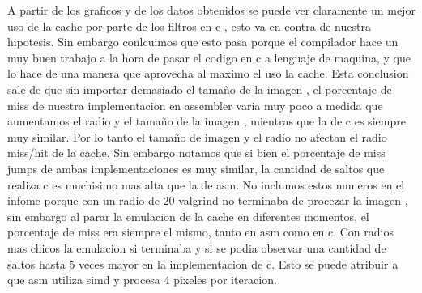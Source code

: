 A partir de los graficos y de los datos obtenidos se puede ver claramente un mejor uso de la cache por parte de los filtros en c , esto va en contra de nuestra hipotesis. Sin embargo conlcuimos que esto pasa porque el compilador hace un muy buen trabajo a la hora de pasar el codigo en c a lenguaje de maquina, y que lo hace de una manera que aprovecha al maximo el uso la cache. Esta conclusion sale de que sin importar demasiado el tamaño de la imagen , el porcentaje de miss de nuestra implementacion en assembler varia muy poco a medida que aumentamos el radio y el tamaño de la imagen , mientras que la de c es siempre muy similar. Por lo tanto el tamaño de imagen y el radio no afectan el radio miss/hit de la cache. Sin embargo notamos que si bien el porcentaje de miss jumps de ambas implementaciones es muy similar, la cantidad de saltos que realiza c es muchisimo mas alta que la de asm. No inclumos estos numeros en el infome porque con un radio de 20 valgrind no terminaba de procezar la imagen , sin embargo al parar la emulacion de la cache en diferentes momentos, el porcentaje de miss era siempre el mismo, tanto en asm como en c. Con radios mas chicos la emulacion si terminaba y si se podia observar una cantidad de saltos hasta 5 veces mayor en la implementacion de c. Esto se puede atribuir a que asm utiliza simd y procesa 4 pixeles por iteracion.

